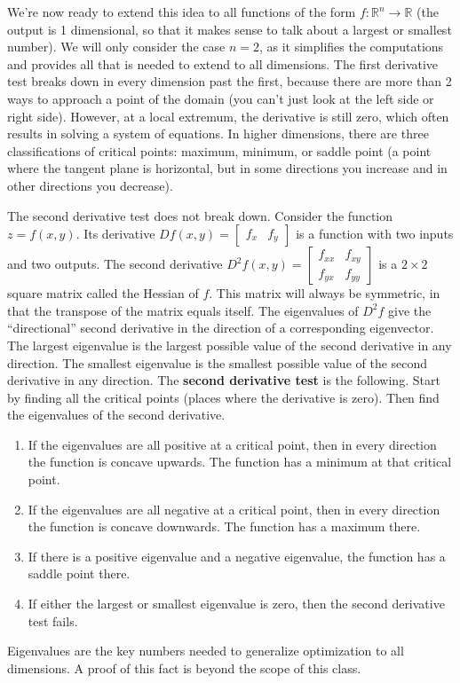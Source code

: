 \documentclass[10pt]{article}
\begin{document}
We're now ready to extend this idea to all functions of the form $f:{\mathbb{R}}^n\to{\mathbb{R}}$ (the output is 1 dimensional, so that it makes sense to talk about a largest or smallest number). We will only consider the case $n=2$, as it simplifies the computations and provides all that is needed to extend to all dimensions. The first derivative test breaks down in every dimension past the first, because there are more than 2 ways to approach a point of the domain (you can't just look at the left side or right side). However, at a local extremum, the derivative is still zero, which often results in solving a system of equations. In higher dimensions, there are three classifications of critical points: maximum, minimum, or saddle point (a point where the tangent plane is horizontal, but in some directions you increase and in other directions you decrease). 

The second derivative test does not break down. Consider the function $z=f(x,y)$. Its derivative $Df(x,y) = \begin{bmatrix}f_x&f_y\end{bmatrix}$ is a function with two inputs and two outputs. The second derivative {$D^2f (x,y)= \begin{bmatrix}f_{xx}&f_{xy}\\f_{yx}&f_{yy}\end{bmatrix} $} is a {$2\times 2$} square matrix called the Hessian of $f$. This matrix will always be symmetric, in that the transpose of the matrix equals itself. The eigenvalues of $D^2f$ give the ``directional'' second derivative in the direction of a corresponding eigenvector. The largest eigenvalue is the largest possible value of the second derivative in any direction. The smallest eigenvalue is the smallest possible value of the second derivative in any direction. The \textbf{second derivative test} is the following. Start by finding all the critical points (places where the derivative is zero). Then find the eigenvalues of the second derivative. 
\begin{enumerate}
	\item If the eigenvalues are all positive at a critical point, then in every direction the function is concave upwards. The function has a minimum at that critical point.  
	\item If the eigenvalues are all negative at a critical point, then in every direction the function is concave downwards. The function has a maximum there.  
	\item If there is a positive eigenvalue and a negative eigenvalue, the function has a saddle point there.  
	\item If either the largest or smallest eigenvalue is zero, then the second derivative test fails. 
\end{enumerate}
Eigenvalues are the key numbers needed to generalize optimization to all dimensions. A proof of this fact is beyond the scope of this class.
\end{document}
